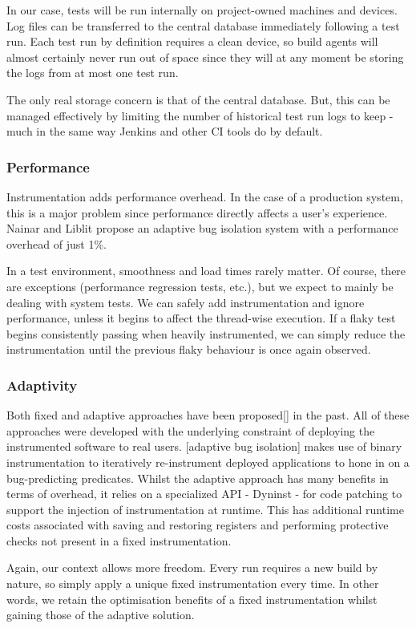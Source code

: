 In our case, tests will be run internally on project-owned machines and devices. Log files can be transferred to the central database immediately following a test run. Each test run by definition requires a clean device, so build agents will almost certainly never run out of space since they will at any moment be storing the logs from at most one test run.

The only real storage concern is that of the central database. But, this can be managed effectively by limiting the number of historical test run logs to keep - much in the same way Jenkins and other CI tools do by default.


\subsubsection{Performance}

Instrumentation adds performance overhead. In the case of a production system, this is a major problem since performance directly affects a user’s experience. Nainar and Liblit \cite{ArumugaNainar:2010:ABI:1806799.1806839} propose an adaptive bug isolation system with a performance overhead of just 1\%.

In a test environment, smoothness and load times rarely matter. Of course, there are exceptions (performance regression tests, etc.), but we expect to mainly be dealing with system tests. We can safely add instrumentation and ignore performance, unless it begins to affect the thread-wise execution. If a flaky test begins consistently passing when heavily instrumented, we can simply reduce the instrumentation until the previous flaky behaviour is once again observed.

\subsubsection{Adaptivity}

Both fixed and adaptive approaches have been proposed[] in the past. All of these approaches were developed with the underlying constraint of deploying the instrumented software to real users. [adaptive bug isolation] makes use of binary instrumentation to iteratively re-instrument deployed applications to hone in on a bug-predicting predicates. Whilst the adaptive approach has many benefits in terms of overhead, it relies on a specialized API - Dyninst - for code patching to support the injection of  instrumentation at runtime. This has additional runtime costs \cite{DyninstGuide} associated with saving and restoring registers and performing protective checks not present in a fixed instrumentation.

Again, our context allows more freedom. Every run requires a new build by nature, so simply apply a unique fixed instrumentation every time. In other words, we retain the optimisation benefits of a fixed instrumentation whilst gaining those of the adaptive solution.

